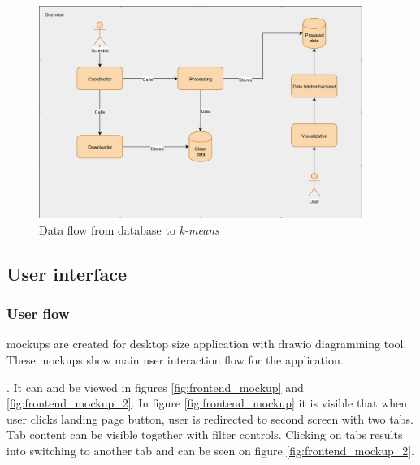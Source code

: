 \documentclass[a4paper,12pt]{article}
\begin{document}
      	\begin{figure}[H]	
	    	\centering
	    	\includegraphics[width=10.5cm]{images/data_flow_overview.png}
	    	\caption{Data flow from database to \textit{k-means}}
	    	\label{fig:data_flow_pipeline}
  		\end{figure}
		
		    \vspace{1cm}
		    
	\clearpage
	
	\subsection{User interface}
	
	\subsubsection{User flow}
	
	\glspl{mockup} are created for desktop size application with \gls{drawio} diagramming tool. These mockups show main user interaction flow for the application.
	
	. It can and be viewed in figures \ref{fig:frontend_mockup} and \ref{fig:frontend_mockup_2}. In figure \ref{fig:frontend_mockup} it is visible that  when user clicks landing page button, user is redirected to second screen with two tabs. Tab content can be visible together with filter controls. Clicking on tabs results into switching to another tab and can be seen on figure \ref{fig:frontend_mockup_2}.
	
\end{document}
